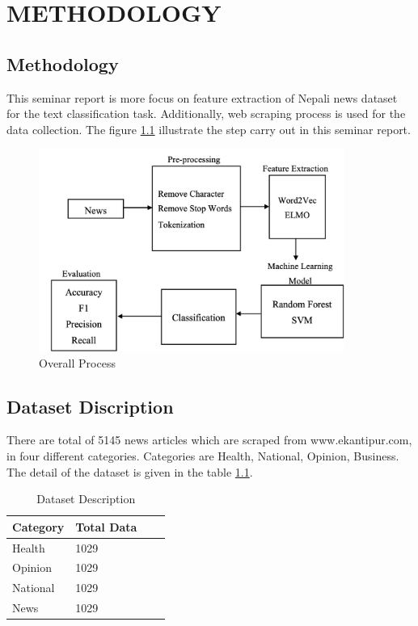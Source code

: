 \chapter{METHODOLOGY}
\section{Methodology}
This seminar report is more focus on feature extraction of Nepali news dataset for the text classification task. Additionally, web scraping process is used for the data collection. The figure \ref{fig:Overall} illustrate the step carry out in this seminar report.
\begin{figure}[H]
	\centering 
	\vspace{10pt}\includegraphics[width=10cm]{images/methodology.png}
	\caption{Overall Process} 
	\label{fig:Overall}
\end{figure}
\section{Dataset Discription}
There are total of 5145 news articles which are scraped from www.ekantipur.com, in four different categories. Categories are Health, National, Opinion, Business. The detail of the dataset is given in the table \ref{table:Dataset}. 
\begin{center}
\begin{table}
\caption{Dataset Description}
\label{table:Dataset}
\centering
\begin{tabular}{ |p{3cm}||p{3cm}|p{3cm}|p{3cm}|  }
 \hline
 Category& Total Data \\
 \hline
 Health   & 1029    \\
 Opinion&   1029  \\
 National &1029\\
 News &1029 \\
 \hline
\end{tabular}
\end{table}
\end{center}
